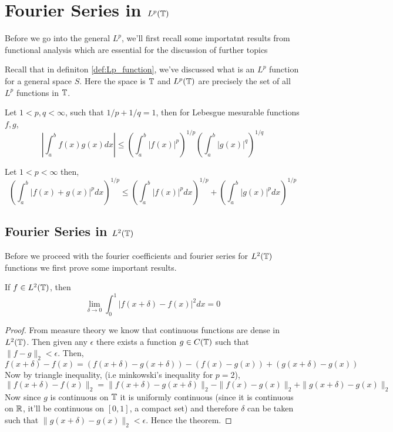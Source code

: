 \newpage
\section{Fourier Series in $L^p(\mathbb T)$}
Before we go into the general $L^p$, we'll first recall some importatnt results from functional analysis which are essential for the discussion of further topics

Recall that in definiton \ref{def:Lp_function}, we've discussed what is an $L^p$ function for a general space $S$. Here the space is $\mathbb T$ and $L^p(\mathbb T)$ are precisely the set of all $L^p$ functions in $\mathbb T$.

\begin{theorem}
  \label{thm:Holder_inequality_for_integrals}
  Let $1 < p, q < \infty$, such that $1/p + 1/q = 1$, then for Lebesgue mesurable functions $f, g$,
  $$ \left| \int_a^b f(x)g(x) dx \right| \le \left(\int_a^b |f(x)|^p \right)^{1/p} \left(\int_a^b |g(x)|^q \right)^{1/q}$$
\end{theorem}

\begin{theorem}
  \label{thm:Minkowski_inequality_for_integrals}
 Let $1 < p < \infty$ then, 
  $$\left(\int_a^b |f(x) + g(x)|^p dx \right)^{1/p} \le \left( \int_a^b |f(x)|^p dx \right)^{1/p} + \left( \int_a^b |g(x)|^p dx \right)^{1/p}$$
\end{theorem} 

\subsection{Fourier Series in $L^2(\mathbb T)$}
Before we proceed with the fourier coefficients and fourier series for $L^2(\mathbb T)$ functions we first prove some important results.
\begin{proposition}
  \label{prop:L2_functions_are_continuous_in_L2_norm}
  If $f \in L^2(\mathbb T)$, then
  \begin{displaymath}
   \lim_{\delta \to 0} \int_0^1 |f(x+\delta) - f(x)|^2 dx = 0
  \end{displaymath}
\end{proposition}
\begin{proof}
  From measure theory we know that continuous functions are dense in $L^2(\mathbb T)$. Then given any $\epsilon$ there exists a function $g\in C(\mathbb T)$ such that $\|f-g\|_2 < \epsilon$. Then,
  $$ f(x+\delta) - f(x) = (f(x+\delta) - g(x+\delta)) - (f(x) - g(x)) + ( g(x+\delta) - g(x))$$
  Now by triangle inequality, (i.e minkowski's inequality for $p = 2$), 
  $$ \|f(x+\delta) - f(x)\|_2 = \|f(x+\delta) - g(x+\delta)\|_2 - \|f(x) - g(x)\|_2 + \|g(x+\delta) - g(x)\|_2$$
  Now since $g$ is continuous on $\mathbb T$ it is uniformly continuous (since it is continuous on $\mathbb R$, it'll be continuous on $[0,1]$, a compact set) and therefore $\delta$ can be taken such that $\|g(x+\delta) - g(x) \|_2 < \epsilon$. Hence the theorem.
\end{proof}

